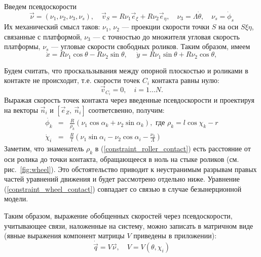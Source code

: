 Введем псевдоскорости
$$\vec{\nu} = (\nu_1, \nu_2, \nu_3, \nu_s), \quad \vec{v}_S = R\nu_1\vec{e}_\xi + R\nu_2\vec{e}_\eta, \quad \nu_3 = \Lambda\dot{\theta},\quad \nu_s = \dot{\phi}_s$$
Их механический смысл таков: $\nu_1$, $\nu_2$ --- проекции скорости точки $S$ на оси $S\xi\eta$, связанные с платформой, $\nu_3$ --- с точностью до множителя угловая скорость платформы, $\nu_s$ --- угловые скорости свободных роликов. Таким образом, имеем
$$ \dot{x} = R \nu_1\cos\theta-R\nu_2\sin\theta, \hspace{15pt} \dot{y} = R\nu_1\sin\theta+R\nu_2\cos\theta,$$

Будем считать, что проскальзывания между опорной плоскостью и роликами в контакте не происходит, т.е.
скорости точек $C_i$ контакта равны нулю:
$$\vec{v}_{C_i} = 0,\quad i = 1\dots N.$$
Выражая скорость точек контакта через введенные псевдоскорости и проектируя на векторы $\vec{n}_i$ и $[\vec{e}_Z,\ \vec{n}_i]$ соответсвенно, получим:
\begin{eqnarray}
\dot{\phi_k} &=& \frac{R}{\rho_k }(\nu_1\cos\alpha_k + \nu_2\sin\alpha_k),\text{ где } \rho_k  = l\cos\chi_k - r \label{constraint_roller_contact}\\
\dot{\chi}_i &=& \frac{R}{l}(\nu_1\sin\alpha_i - \nu_2\cos\alpha_i - \frac{\nu_3}{\Lambda})\label{constraint_wheel_contact}
\end{eqnarray}
Заметим, что знаменатель $\rho_k$ в (\ref{constraint_roller_contact}) есть расстояние от оси ролика до точки контакта, обращающееся в ноль на стыке роликов (см. рис.~\ref{fig:wheel}). Это обстоятельство приводит к неустранимым разрывам правых частей уравнений движения и будет рассмотрено отдельно ниже.
Уравнение (\ref{constraint_wheel_contact}) совпадает со связью в случае безынерционной модели. 

Таким образом, выражение обобщенных скоростей через псевдоскорости, учитывающее связи, наложенные на систему, можно записать в матричном виде (явные выражения компонент матрицы $V$ приведены в приложении):
\begin{equation}
    \dot{\vec{q}} = V\vec{\nu},\quad V = V(\theta,\chi_i)
\end{equation}
